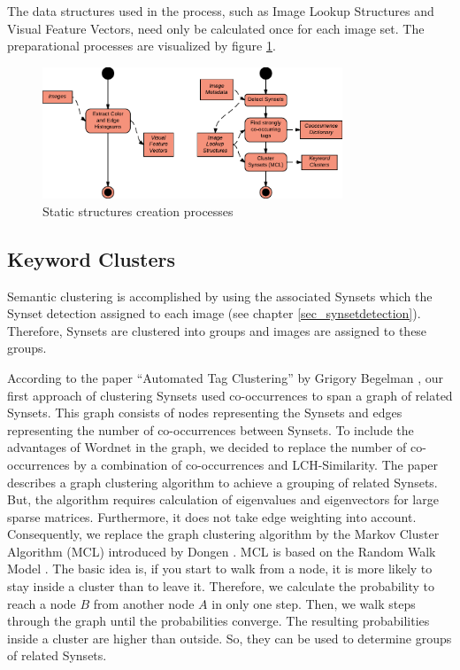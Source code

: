 The data structures used in the process, such as Image Lookup Structures and Visual Feature Vectors, need only be calculated once for each image set. The preparational processes are visualized by figure \ref{fig_precalcprocess}.

\begin{figure}[h]
\centering
\includegraphics[width=0.8\textwidth]{images/precalcs_activity_diagram.pdf}
\caption{Static structures creation processes}
\label{fig_precalcprocess}
\end{figure}


\subsection{Keyword Clusters}
\label{sec_keywordclustering}
Semantic clustering is accomplished by using the associated Synsets which the Synset detection assigned to each image (see chapter \ref{sec_synsetdetection}). Therefore, Synsets are clustered into groups and images are assigned to these groups.

\bigskip
According to the paper ``Automated Tag Clustering'' by Grigory Begelman \cite{begelman2006automated}, our first approach of clustering Synsets used co-occurrences to span a graph of related Synsets. This graph consists of nodes representing the Synsets and edges representing the number of co-occurrences between Synsets. To include the advantages of Wordnet in the graph, we decided to replace the number of co-occurrences by a combination of co-occurrences and LCH-Similarity. The paper describes a graph clustering algorithm to achieve a grouping of related Synsets. But, the algorithm requires calculation of eigenvalues and eigenvectors for large sparse matrices. Furthermore, it does not take edge weighting into account. Consequently, we replace the graph clustering algorithm by the Markov Cluster Algorithm (MCL) introduced by Dongen \cite{Dongen1998}. MCL is based on the Random Walk Model \cite{spitzer2001principles}. The basic idea is, if you start to walk from a node, it is more likely to stay inside a cluster than to leave it. Therefore, we calculate the probability to reach a node $B$ from another node $A$ in only one step. Then, we walk steps through the graph until the probabilities converge. The resulting probabilities inside a cluster are higher than outside. So, they can be used to determine groups of related Synsets.


